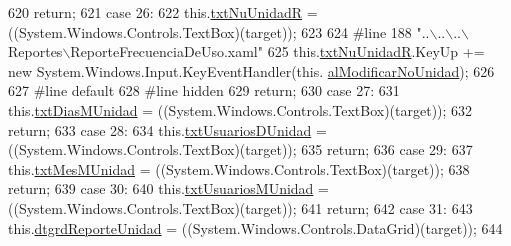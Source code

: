 \begin{DoxyCode}
620             \textcolor{keywordflow}{return};
621             \textcolor{keywordflow}{case} 26:
622             this.\hyperlink{class_proyecto___integrador__3_1_1_reportes_1_1_reporte_frecuencia_de_uso_ad3104fe9d62ad8d1d810606d9b182b9c}{txtNuUnidadR} = ((System.Windows.Controls.TextBox)(target));
623             
624 \textcolor{preprocessor}{            #line 188 "..\(\backslash\)..\(\backslash\)..\(\backslash\)Reportes\(\backslash\)ReporteFrecuenciaDeUso.xaml"}
625 \textcolor{preprocessor}{}            this.\hyperlink{class_proyecto___integrador__3_1_1_reportes_1_1_reporte_frecuencia_de_uso_ad3104fe9d62ad8d1d810606d9b182b9c}{txtNuUnidadR}.KeyUp += \textcolor{keyword}{new} System.Windows.Input.KeyEventHandler(this.
      \hyperlink{class_proyecto___integrador__3_1_1_reportes_1_1_reporte_frecuencia_de_uso_ab492b354529c37416df38afe0c49a20d}{alModificarNoUnidad});
626             
627 \textcolor{preprocessor}{            #line default}
628 \textcolor{preprocessor}{}\textcolor{preprocessor}{            #line hidden}
629 \textcolor{preprocessor}{}            \textcolor{keywordflow}{return};
630             \textcolor{keywordflow}{case} 27:
631             this.\hyperlink{class_proyecto___integrador__3_1_1_reportes_1_1_reporte_frecuencia_de_uso_ac57af5c45eb5829244bdb033e19a7ea8}{txtDiasMUnidad} = ((System.Windows.Controls.TextBox)(target));
632             \textcolor{keywordflow}{return};
633             \textcolor{keywordflow}{case} 28:
634             this.\hyperlink{class_proyecto___integrador__3_1_1_reportes_1_1_reporte_frecuencia_de_uso_a0b2b2103ff7f1f55f8698b23e1672dbe}{txtUsuariosDUnidad} = ((System.Windows.Controls.TextBox)(target));
635             \textcolor{keywordflow}{return};
636             \textcolor{keywordflow}{case} 29:
637             this.\hyperlink{class_proyecto___integrador__3_1_1_reportes_1_1_reporte_frecuencia_de_uso_ae9d8312f5f3d8cef187f25210a97ad43}{txtMesMUnidad} = ((System.Windows.Controls.TextBox)(target));
638             \textcolor{keywordflow}{return};
639             \textcolor{keywordflow}{case} 30:
640             this.\hyperlink{class_proyecto___integrador__3_1_1_reportes_1_1_reporte_frecuencia_de_uso_a94304e1e8d7eae9ba6aad17385c65664}{txtUsuariosMUnidad} = ((System.Windows.Controls.TextBox)(target));
641             \textcolor{keywordflow}{return};
642             \textcolor{keywordflow}{case} 31:
643             this.\hyperlink{class_proyecto___integrador__3_1_1_reportes_1_1_reporte_frecuencia_de_uso_a76928c8b382b0997a3e7a9f57369c6c0}{dtgrdReporteUnidad} = ((System.Windows.Controls.DataGrid)(target));
644             

\end{DoxyCode}

